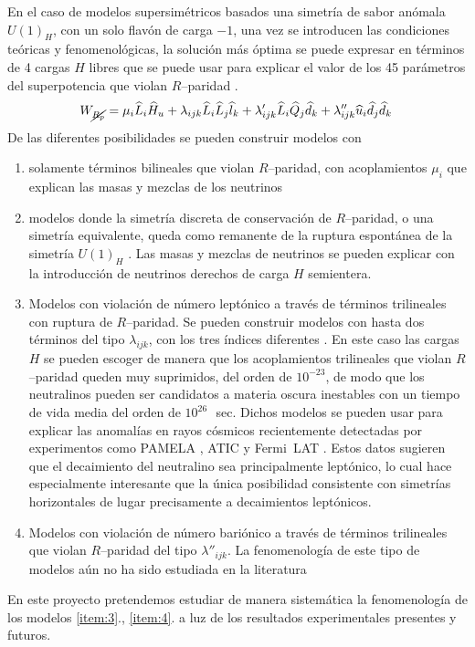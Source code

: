 En el caso de modelos supersimétricos basados una simetría de sabor anómala $U(1)_H$, con un solo flavón de carga $-1$, una vez se introducen las condiciones teóricas y fenomenológicas, la solución más óptima se puede expresar en términos de 4 cargas $H$ libres que se puede usar para explicar el valor de los 45 parámetros del superpotencia que violan $R$--paridad \cite{Mira:2000gg,Dreiner:2003hw,Dreiner:2003yr,Dreiner:2007vp,Dreiner:2006xw,Sierra:2009zq}.
\begin{equation}
  \label{eq:5}
  W_{\cancel{R_p}} = \mu_i\widehat{L}_i\widehat{H}_u +
  \lambda_{i j k}\widehat{L}_i\widehat{L}_j\widehat{l}_k +
  \lambda'_{i j k}\widehat{L}_i\widehat{Q}_j\widehat{d}_k +
  \lambda''_{ijk}\widehat{u}_i\widehat{d}_j\widehat{d}_k\,
\end{equation}
De las diferentes posibilidades se pueden construir modelos con
\begin{enumerate}
\item solamente términos bilineales que violan $R$--paridad, con acoplamientos $\mu_i$ que explican las masas y mezclas de los neutrinos \cite{Mira:2000gg,Dreiner:2003hw,Dreiner:2006xw}
\label{item:1}
\item modelos donde la simetría discreta de conservación de $R$--paridad, o una simetría equivalente, queda como remanente de la ruptura espontánea de la simetría $U(1)_H$ \cite{Dreiner:2003hw,Dreiner:2003yr,Dreiner:2007vp}. Las masas y mezclas de neutrinos se pueden explicar con la introducción de neutrinos derechos de carga $H$ semientera.
\label{item:2}
\item Modelos con violación de número leptónico a través de términos trilineales con ruptura de $R$--paridad. Se pueden construir modelos con hasta dos términos del tipo $\lambda_{ijk}$, con los tres índices diferentes \cite{Sierra:2009zq}.  En este caso las cargas $H$ se pueden escoger de manera que los acoplamientos trilineales que violan $R$--paridad queden muy suprimidos, del orden de $10^{-23}$, de modo que los neutralinos pueden ser  candidatos a materia oscura inestables con un tiempo de vida media del orden de $10^{26}\,$~sec. Dichos modelos se pueden usar para explicar las anomalías en rayos cósmicos \cite{Sierra:2009zq} recientemente detectadas por experimentos como PAMELA \cite{Adriani:2008zr}, ATIC \cite{:2008zzr} y Fermi~LAT \cite{Abdo:2009zk}. Estos datos sugieren que el decaimiento del neutralino sea principalmente leptónico, lo cual hace especialmente interesante que la única posibilidad consistente con simetrías horizontales de lugar precisamente a decaimientos leptónicos.
\label{item:3}
\item Modelos con violación de número bariónico a través de términos trilineales que violan $R$--paridad del tipo $\lambda''_{ijk}$. La fenomenología de este tipo de modelos aún no ha sido estudiada en la literatura
\label{item:4}
\end{enumerate}
En este proyecto pretendemos estudiar de manera sistemática la fenomenología de los modelos \ref{item:3}., \ref{item:4}. a luz de los resultados experimentales presentes y futuros.

